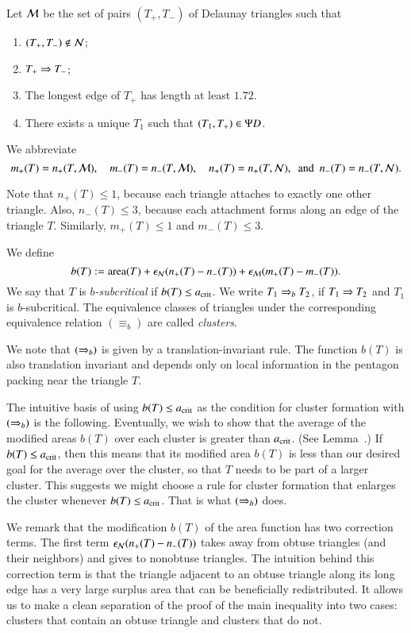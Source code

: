 Let $\mathcal M$ be the set of pairs $(T_+,T_-)$ of Delaunay triangles such that
\begin{enumerate}
\item $(T_+,T_-)\not\in \mathcal N$;
\item $T_+\Rightarrow T_-$;
\item The longest edge of $T_+$ has length  at least $1.72$.
\item There exists a unique $T_1$ such that $(T_1,T_+)\in \Psi D$.
\end{enumerate}

We abbreviate 
\[
m_+(T) = n_+(T,\M), 
\quad m_-(T) = n_-(T,\M), 
\quad n_+(T) =n_+(T,\N), 
\ \text{ and } \ 
n_-(T) = n_-(T,\N).
\]

\begin{remark}
  Note  that $n_+(T)\le 1$, because each triangle attaches to
  exactly one other triangle.  Also, $n_-(T)\le 3$, because each
  attachment forms along an edge of the triangle $T$.  Similarly,
  $m_+(T)\le 1$ and $m_-(T)\le 3$.
\end{remark}


We define
\begin{equation}
b(T) := {\operatorname{area}}(T) + \epsilon_{\mathcal N} (n_+(T) - n_-(T)) + \epsilon_{\mathcal M} (m_+(T) - m_-(T)).
\end{equation}
We say that $T$ is {\it $b$-subcritical} if $b(T) \le a_\text{crit}$.  We write
$T_1\Rightarrow_{b} T_2$, if $T_1\Rightarrow T_2$ and $T_1$ is $b$-subcritical.  The
equivalence classes of triangles under the corresponding equivalence
relation $(\equiv_b)$ are called {\it clusters}.

We note that $(\Rightarrow_{b})$ is given by a translation-invariant rule.  The
function $b(T)$ is also translation invariant and depends only on
local information in the pentagon packing near the triangle $T$.

The intuitive basis of using $b(T)\le a_\text{crit}$ as the condition for
cluster formation with $(\Rightarrow_{b})$ is the following.  Eventually, we wish
to show that the average of the modified areas $b(T)$ over each
cluster is greater than $a_\text{crit}$.  (See Lemma~.)  If
$b(T)\le a_\text{crit}$, then this means that its modified area $b(T)$ is less
than our desired goal  for the average over the cluster, so that
$T$ needs to be part of a larger cluster.  This suggests we might choose
a rule for cluster formation that enlarges the cluster whenever
$b(T)\le a_\text{crit}$. That is what $(\Rightarrow_{b})$ does.

We remark that the modification $b(T)$ of the area function has two
correction terms.  The first term $\epsilon_{\mathcal N} (n_+(T) - n_-(T))$ takes away
from obtuse triangles (and their neighbors) and gives to nonobtuse
triangles.  The intuition behind this correction term is that the
triangle adjacent to an obtuse triangle along its long edge has a very
large surplus area that can be beneficially redistributed.  It allows
us to make a clean separation of the proof of the main inequality into
two cases: clusters that contain an obtuse triangle and clusters that
do not.  

